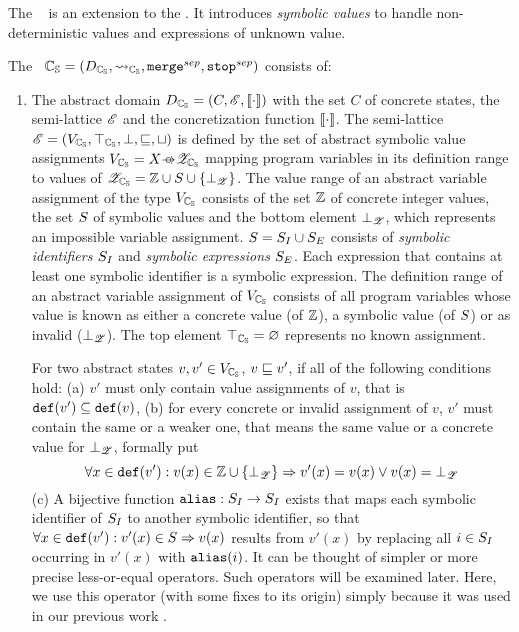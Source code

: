 \subsubsection{\SymbolicValueAnalysisCPA}
The \symbolicValueAnalysisCPA\ \cite{Lemberger2015} is an extension to the . It introduces \emph{symbolic values} to handle non-deterministic values and expressions of unknown value.

The \symbolicValueAnalysisCPA\ $\mathbb{C_{S}} = (D_{\mathbb{C_{S}}}, \rightsquigarrow_{\mathbb{C_{S}}}, \texttt{merge}^{sep}, \texttt{stop}^{sep})$ consists of:
\begin{enumerate}[leftmargin=*, label=\arabic*.]
\item The abstract domain $D_{\mathbb{C_{S}}} = (C, \mathscr{E}, [\![ \cdot ]\!])$ with the set $C$ of concrete states,
	the semi-lattice $\mathscr{E}$ and
	the concretization function $[\![ \cdot ]\!]$.
	The semi-lattice $\mathscr{E} = (V_{\mathbb{C_{S}}}, \top_{\mathbb{C_{S}}}, \bot, \sqsubseteq, \sqcup)$ is defined by
	the set of abstract symbolic value assignments $\symvalAssignment = X \partialFunc \symvalset$ mapping program variables in its definition range to values of
	${\mathscr{Z}_{\mathbb{C_{S}}}} = \mathbb{Z} \cup S \cup \{ \bot_{\mathscr{Z}} \}$.
	The value range of an abstract variable assignment of the type $V_{\mathbb{C_{S}}}$ consists of the set $\mathbb{Z}$ of concrete integer values,
	the set $S$ of symbolic values and the bottom element $\bot_{\mathscr{Z}}$, which represents an impossible variable assignment.
	$S = S_I \cup S_E$ consists of \emph{symbolic identifiers} $S_I$ and \emph{symbolic expressions} $S_E$.
	Each expression that contains at least one symbolic identifier is a symbolic expression.
	The definition range of an abstract variable assignment of $V_{\mathbb{C_{S}}}$ consists of all program variables whose value is known as either a concrete value (of $\mathbb{Z}$),
	a symbolic value (of $S$) or as invalid ($\bot_{\mathscr{Z}}$).
	The top element $\top_{\mathbb{C_{S}}} = \varnothing$ represents no known assignment.

	For two abstract states $v, v' \in V_{\mathbb{C_{S}}}$, $v \sqsubseteq v'$, if all of the following conditions hold:
	(a) $v'$ must only contain value assignments of $v$, that is $\texttt{def}(v') \subseteq \texttt{def}(v)$,
	(b) for every concrete or invalid assignment of $v$, $v'$ must contain the same or a weaker one, that means the same value or a concrete value for $\bot_{\mathscr{Z}}$, formally put
	\[\forall x \in \texttt{def}(v') : v(x) \in \mathbb{Z} \cup \{\bot_{\mathscr{Z}}\} \Rightarrow v'(x) = v(x) \vee v(x) = \bot_{\mathscr{Z}}\]
	(c) A bijective function $\texttt{alias} : S_I \rightarrow S_I$ exists that maps each symbolic identifier of $S_I$ to another symbolic identifier, so that
	$\forall x \in \texttt{def}(v') : v'(x) \in S \Rightarrow v(x)$ results from $v'(x)$ by replacing all $i \in S_I$ occurring in $v'(x)$ with $\texttt{alias}(i)$.
	It can be thought of simpler or more precise less-or-equal operators. Such operators will be examined later.
	Here, we use this operator (with some fixes to its origin) simply because it was used in our previous work \cite{Lemberger2015}.


\end{enumerate}
